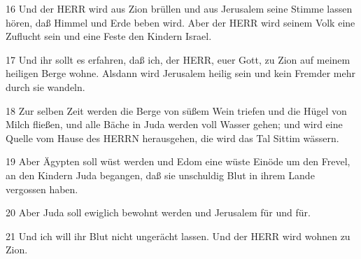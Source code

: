 \par 16 Und der HERR wird aus Zion brüllen und aus Jerusalem seine Stimme lassen hören, daß Himmel und Erde beben wird. Aber der HERR wird seinem Volk eine Zuflucht sein und eine Feste den Kindern Israel.
\par 17 Und ihr sollt es erfahren, daß ich, der HERR, euer Gott, zu Zion auf meinem heiligen Berge wohne. Alsdann wird Jerusalem heilig sein und kein Fremder mehr durch sie wandeln.
\par 18 Zur selben Zeit werden die Berge von süßem Wein triefen und die Hügel von Milch fließen, und alle Bäche in Juda werden voll Wasser gehen; und wird eine Quelle vom Hause des HERRN herausgehen, die wird das Tal Sittim wässern.
\par 19 Aber Ägypten soll wüst werden und Edom eine wüste Einöde um den Frevel, an den Kindern Juda begangen, daß sie unschuldig Blut in ihrem Lande vergossen haben.
\par 20 Aber Juda soll ewiglich bewohnt werden und Jerusalem für und für.
\par 21 Und ich will ihr Blut nicht ungerächt lassen. Und der HERR wird wohnen zu Zion.


